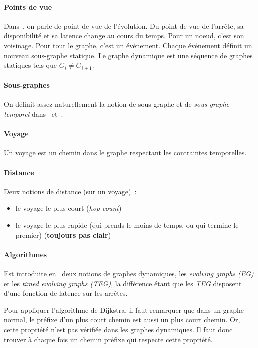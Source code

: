 \documentclass[11pt,a4paper]{article}
\begin{document}
\paragraph{Points de vue}
Dans~\cite{casteigts2012time}, on parle de point de vue de
l'évolution. Du point de vue de l'arrête, sa disponibilité et sa
latence change au cours du temps. Pour un noeud, c'est son voisinage.
Pour tout le graphe, c'est un événement. Chaque événement définit un
nouveau sous-graphe statique. Le graphe dynamique est une séquence de
graphes statiques tels que \(G_i \neq G_{i+1}\).

\paragraph{Sous-graphes}
On définit assez naturellement la notion de sous-graphe et de
\textit{sous-graphe temporel} dans~\cite{casteigts2012time}
et~\cite{latapy2017stream}.

\paragraph{Voyage}
Un voyage est un chemin dans le graphe respectant les contraintes
temporelles.

\paragraph{Distance}
Deux notions de distance (sur un voyage)~:
\begin{itemize}
\item le voyage le plus court (\textit{hop-count})
\item le voyage le plus rapide (qui prends le moins de temps, ou qui
  termine le premier) (\textbf{toujours pas clair})
\end{itemize}

\paragraph{Algorithmes}
Est introduite en~\cite{xuan2003computing} deux notions de graphes
dynamiques, les \textit{evolving graphs (EG)} et les \textit{timed
  evolving graphs (TEG)}, la différence étant que les \textit{TEG}
disposent d'une fonction de latence sur les arrêtes.

Pour appliquer l'algorithme de Dijkstra, il faut remarquer que dans un
graphe normal, le préfixe d'un plus court chemin est aussi un plus
court chemin. Or, cette propriété n'est pas vérifiée dans les graphes
dynamiques. Il faut donc trouver à chaque fois un chemin préfixe qui
respecte cette propriété.
\end{document}
